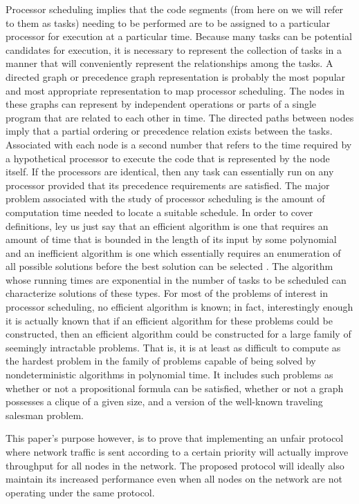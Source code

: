 \documentclass{sigcomm-alternate}
\begin{document}
Processor scheduling implies that the code segments (from here on we will refer to them as tasks) needing to be performed are to be assigned to a particular processor for execution at a particular time. Because many tasks can be potential candidates for execution, it is necessary to represent the collection of tasks in a manner that will conveniently represent the relationships among the tasks. A directed graph or precedence graph representation is probably the most popular and most appropriate representation to map processor scheduling. The nodes in these graphs can represent by independent operations or parts of a single program that are related to each other in time. The directed paths between nodes imply that a partial ordering or precedence relation exists between the tasks. Associated with each node is a second number that refers to the time required by a hypothetical processor to execute the code that is represented by the node itself. If the processors are identical, then any task can essentially run on any processor provided that its precedence requirements are satisfied. 
The major problem associated with the study of processor scheduling is the amount of computation time needed to locate a suitable schedule. In order to cover definitions, ley us just say that an efficient algorithm is one that requires an amount of time that is bounded in the length of its input by some polynomial and an inefficient algorithm is one which essentially requires an enumeration of all possible solutions before the best solution can be selected \cite{Gonzalez}. The algorithm whose running times are exponential in the number of tasks to be scheduled can characterize solutions of these types. For most of the problems of interest in processor scheduling, no efficient algorithm is known; in fact, interestingly enough it is actually known that if an efficient algorithm for these problems could be constructed, then an efficient algorithm could be constructed for a large family of seemingly intractable problems. That is, it is at least as difficult to compute as the hardest problem in the family of problems capable of being solved by nondeterministic algorithms in polynomial time. It includes such problems as whether or not a propositional formula can be satisfied, whether or not a graph possesses a clique of a given size, and a version of the well-known traveling salesman problem. 


This paper's purpose however, is to prove that implementing an unfair protocol where network traffic is sent according to a certain priority will actually improve throughput for all nodes in the network. The proposed protocol will ideally also maintain its increased performance even when all nodes on the network are not operating under the same protocol. 
\end{document}
